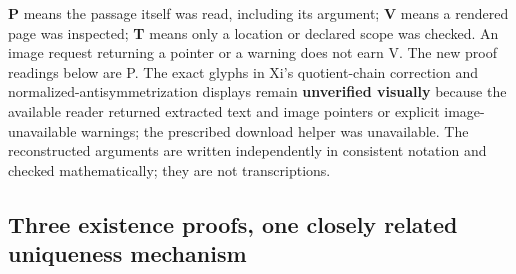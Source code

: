 \documentclass[
  11pt,
]{article}
\begin{document}
\textbf{P} means the passage itself was read, including its argument;
\textbf{V} means a rendered page was inspected; \textbf{T} means only a
location or declared scope was checked. An image request returning a
pointer or a warning does not earn V. The new proof readings below are
P. The exact glyphs in Xi's quotient-chain correction and
normalized-antisymmetrization displays remain \textbf{unverified
visually} because the available reader returned extracted text and image
pointers or explicit image-unavailable warnings; the prescribed download
helper was unavailable. The reconstructed arguments are written
independently in consistent notation and checked mathematically; they
are not transcriptions.

\subsection{Three existence proofs, one closely related uniqueness
mechanism}\label{three-existence-proofs-one-closely-related-uniqueness-mechanism}
\end{document}
